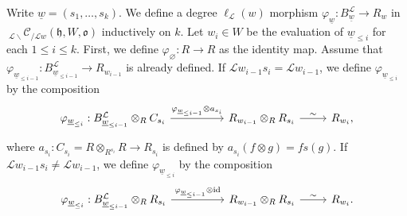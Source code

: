 \documentclass{amsart}
\newcommand{\scrL}{\mathcal{L}}
\DeclareMathOperator{\id}{id}
\newcommand{\fr}[1]{\mathfrak{#1}}
\newcommand{\Cmon}[2]{\:_{#1 \backslash} \mathcal{C}_{/ #2} }
\newcommand{\uw}{\underline{w}}
\renewcommand{\emptyset}{\varnothing}
\theoremstyle{definition}
\numberwithin{equation}{subsection}
\begin{document}
Write $\uw = (s_1, \ldots, s_k)$. We define a degree $\ell_{\scrL} (w)$ morphism $\varphi_{\uw} : B_{\uw}^{\scrL} \to R_w$ in $\Cmon{\scrL}{\scrL w} (\fr{h}, W, \fr{o})$ inductively on $k$.
Let $w_i \in W$ be the evaluation of $\uw_{\leq i}$ for each $1 \leq i \leq k$.
First, we define $\varphi_{\emptyset} : R \to R$ as the identity map. 
Assume that $\varphi_{\uw_{\leq i - 1}} : B_{\uw_{\leq i-1}}^{\scrL} \to R_{w_{i-1}}$ is already defined.
If $\scrL w_{i-1} s_i = \scrL w_{i-1}$, we define $\varphi_{\uw_{\leq i}}$ by the composition 
\[\begin{tikzcd}
    \varphi_{\uw_{\leq i}} : B_{\uw_{\leq i-1}}^{\scrL} \otimes_R C_{s_i} \arrow[rr, "\varphi_{\uw_{\leq i-1}} \otimes a_{s_i}"] &  &  R_{w_{i-1}} \otimes_R R_{s_i} \arrow[r, "\sim"] &  R_{w_i} ,
    \end{tikzcd}\]
where $a_{s_i} : C_{s_i} = R \otimes_{R^{s_i}} R \to R_{s_i}$ is defined by $a_{s_i} (f \otimes g) = f s(g)$. 
If $\scrL w_{i-1} s_i \neq \scrL w_{i-1}$, we define  $\varphi_{\uw_{\leq i}}$ by the composition 
\[\begin{tikzcd}
    \varphi_{\uw_{\leq i}} : B_{\uw_{\leq i-1}}^{\scrL} \otimes_R R_{s_i} \arrow[rr, "\varphi_{\uw_{\leq i-1}} \otimes \id"] &  &  R_{w_{i-1}} \otimes_R R_{s_i} \arrow[r, "\sim"] &  R_{w_i} .
    \end{tikzcd}\]
\end{document}
